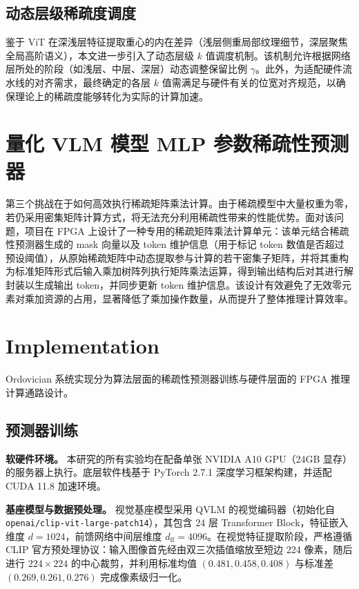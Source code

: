 \documentclass[sigconf]{acmart}
\begin{document}
\subsection{动态层级稀疏度调度}
鉴于 ViT 在深浅层特征提取重心的内在差异（浅层侧重局部纹理细节，深层聚焦全局高阶语义），本文进一步引入了动态层级 $k$ 值调度机制。该机制允许根据网络层所处的阶段（如浅层、中层、深层）动态调整保留比例 $\gamma$。此外，为适配硬件流水线的对齐需求，最终确定的各层 $k$ 值需满足与硬件有关的位宽对齐规范，以确保理论上的稀疏度能够转化为实际的计算加速。
	
	\section{量化 VLM 模型 MLP 参数稀疏性预测器}
	
	第三个挑战在于如何高效执行稀疏矩阵乘法计算。由于稀疏模型中大量权重为零，若仍采用密集矩阵计算方式，将无法充分利用稀疏性带来的性能优势。面对该问题，项目在 FPGA 上设计了一种专用的稀疏矩阵乘法计算单元：该单元结合稀疏性预测器生成的 mask 向量以及 token 维护信息（用于标记 token 数值是否超过预设阈值），从原始稀疏矩阵中动态提取参与计算的若干密集子矩阵，并将其重构为标准矩阵形式后输入乘加树阵列执行矩阵乘法运算，得到输出结构后对其进行解封装以生成输出 token，并同步更新 token 维护信息。该设计有效避免了无效零元素对乘加资源的占用，显著降低了乘加操作数量，从而提升了整体推理计算效率。
	
\section{Implementation}
	
Ordovician 系统实现分为算法层面的稀疏性预测器训练与硬件层面的 FPGA 推理计算通路设计。

\subsection{预测器训练}

\textbf{软硬件环境。}     
本研究的所有实验均在配备单张 NVIDIA A10 GPU（24GB 显存）的服务器上执行。底层软件栈基于 PyTorch 2.7.1 深度学习框架构建，并适配 CUDA 11.8 加速环境。

\textbf{基座模型与数据预处理。} 
视觉基座模型采用 QVLM 的视觉编码器（初始化自 \texttt{openai/clip-vit-large-patch14}），其包含 24 层 Transformer Block，特征嵌入维度 $d=1024$，前馈网络中间层维度 $d_{\mathrm{ff}}=4096$。在视觉特征提取阶段，严格遵循 CLIP 官方预处理协议：输入图像首先经由双三次插值缩放至短边 224 像素，随后进行 $224 \times 224$ 的中心裁剪，并利用标准均值 $(0.481, 0.458, 0.408)$ 与标准差 $(0.269, 0.261, 0.276)$ 完成像素级归一化。
\end{document}
